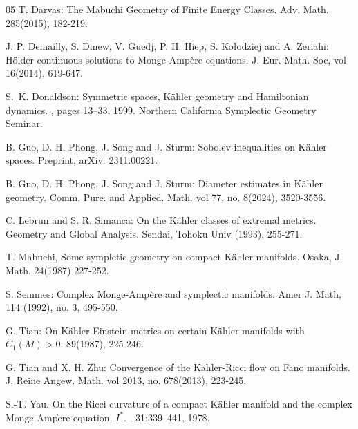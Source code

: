 \documentclass[11pt]{amsart}
\numberwithin{equation}{section}
\begin{document}
\begin{thebibliography}{05}
T. Darvas:
\newblock The Mabuchi Geometry of Finite Energy Classes.
\newblock Adv. Math. 285(2015), 182-219.





J. P. Demailly,  S.  Dinew,  V.  Guedj,  P.  H.  Hiep,  S.  Kołodziej and A.  Zeriahi:
\newblock H\"older continuous solutions to Monge-Ampère equations.
\newblock J.  Eur.  Math.  Soc,  vol 16(2014),  619-647.








S.~K. Donaldson:
\newblock Symmetric spaces, {K}{\"a}hler geometry and {H}amiltonian dynamics.
, pages 13--33, 1999.
\newblock Northern California Symplectic Geometry Seminar.





B.  Guo,  D.  H.  Phong,  J.  Song and J.  Sturm:
\newblock Sobolev inequalities on K\"ahler spaces.
\newblock Preprint,  arXiv: 2311.00221.

B.  Guo,  D.  H.  Phong,  J.  Song and J.  Sturm:
\newblock Diameter estimates in K\"ahler geometry.
\newblock Comm.  Pure.  and Applied.  Math.  vol 77,  no.  8(2024),  3520-3556.







C.  Lebrun and S.  R.  Simanca:
\newblock On the K\"ahler classes of extremal metrics.
\newblock Geometry and Global Analysis.
\newblock Sendai,  Tohoku Univ (1993),  255-271.





T. Mabuchi,
\newblock Some sympletic geometry on compact K\"ahler manifolds.
\newblock Osaka, J. Math. 24(1987) 227-252.







S. Semmes:
\newblock Complex Monge-Ampère and symplectic manifolds.
\newblock Amer J. Math, 114 (1992), no. 3, 495-550.






G. Tian:
\newblock On K\"ahler-Einstein metrics on certain K\"ahler manifolds with $C_1(M)>0$.
 89(1987), 225-246.




G.  Tian and X.  H.  Zhu:
\newblock Convergence of the K\"ahler-Ricci flow on Fano manifolds.
\newblock J.  Reine Angew.  Math.  vol 2013,  no. 678(2013),  223-245.




S.-T. Yau.
\newblock On the {R}icci curvature of a compact {K}\"ahler manifold and the
  complex Monge-Amp$\grave{\text{e}}$re equation, ${I}^*$.
, 31:339--441, 1978.



\end{thebibliography}
\end{document}
